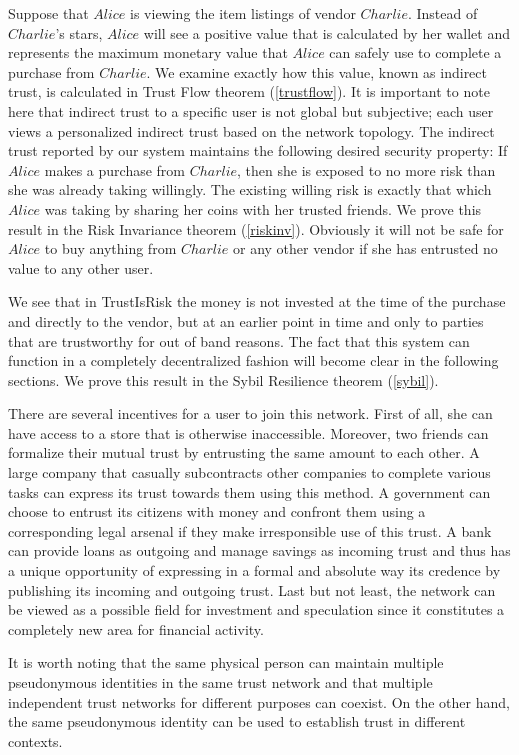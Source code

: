    Suppose that $Alice$ is viewing the item listings of vendor $Charlie$. Instead of $Charlie$'s stars, $Alice$ will see a
   positive value that is calculated by her wallet and represents the maximum monetary value that $Alice$ can safely use to
   complete a purchase from $Charlie$. We examine exactly how this value, known as indirect trust, is calculated in Trust
   Flow theorem (\ref{trustflow}). It is important to note here that indirect trust to a specific user is not global but
   subjective; each user views a personalized indirect trust based on the network topology. The indirect trust reported by
   our system maintains the following desired security property: If $Alice$ makes a purchase from $Charlie$, then she is
   exposed to no more risk than she was already taking willingly. The existing willing risk is exactly that which $Alice$
   was taking by sharing her coins with her trusted friends. We prove this result in the Risk Invariance theorem
   (\ref{riskinv}). Obviously it will not be safe for $Alice$ to buy anything from $Charlie$ or any other vendor if she has
   entrusted no value to any other user.

   We see that in TrustIsRisk the money is not invested at the time of the purchase and directly to the vendor, but at an
   earlier point in time and only to parties that are trustworthy for out of band reasons. The fact that this system can
   function in a completely decentralized fashion will become clear in the following sections. We prove this result in the
   Sybil Resilience theorem (\ref{sybil}).

   There are several incentives for a user to join this network. First of all, she can have access to a store that is
   otherwise inaccessible. Moreover, two friends can formalize their mutual trust by entrusting the same amount to each
   other. A large company that casually subcontracts other companies to complete various tasks can express its trust
   towards them using this method. A government can choose to entrust its citizens with money and confront them using a
   corresponding legal arsenal if they make irresponsible use of this trust. A bank can provide loans as outgoing and
   manage savings as incoming trust and thus has a unique opportunity of expressing in a formal and absolute way its
   credence by publishing its incoming and outgoing trust. Last but not least, the network can be viewed as a possible
   field for investment and speculation since it constitutes a completely new area for financial activity.

   It is worth noting that the same physical person can maintain multiple pseudonymous identities in the same trust network
   and that multiple independent trust networks for different purposes can coexist. On the other hand, the same
   pseudonymous identity can be used to establish trust in different contexts.
